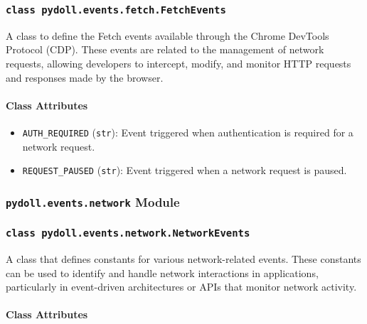 \documentclass{article}
\begin{document}
\subsubsection*{\texttt{class pydoll.events.fetch.FetchEvents}}
\noindent A class to define the Fetch events available through the Chrome DevTools Protocol (CDP). These events are related to the management of network requests, allowing developers to intercept, modify, and monitor HTTP requests and responses made by the browser.

\paragraph{Class Attributes}

\begin{itemize}
    \item \lstinline[style=pythonstyle]|AUTH_REQUIRED| (\lstinline[style=pythonstyle]|str|): Event triggered when authentication is required for a network request.
    \item \lstinline[style=pythonstyle]|REQUEST_PAUSED| (\lstinline[style=pythonstyle]|str|): Event triggered when a network request is paused.
\end{itemize}

\subsubsection*{\texttt{pydoll.events.network} Module}

\subsubsection*{\texttt{class pydoll.events.network.NetworkEvents}}
\noindent A class that defines constants for various network-related events. These constants can be used to identify and handle network interactions in applications, particularly in event-driven architectures or APIs that monitor network activity.

\paragraph{Class Attributes}
\end{document}
